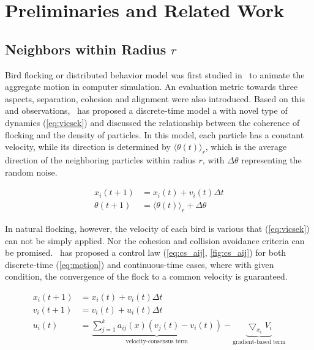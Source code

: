 \chapter{Preliminaries and Related Work}\label{preliminaries}

\section{Neighbors within Radius $r$}\label{flocking}

Bird flocking or distributed behavior model was first studied in~\cite{Reynolds1987} to animate the aggregate motion in computer simulation. An evaluation metric towards three aspects, separation, cohesion and alignment were also introduced. Based on this and observations,~\cite{Vicsek1995} has proposed a discrete-time model a with novel type of dynamics (\ref{eq:vicsek}) and discussed the relationship between the coherence of flocking and the density of particles. In this model, each particle has a constant velocity, while its direction is determined by ${\langle\theta(t)\rangle}_r$, which is the average direction of the neighboring particles within radius $r$, with $\Delta\theta$ representing the random noise.

\begin{equation}\label{eq:vicsek}
\begin{aligned}
x_i(t+1)&=x_i(t)+v_i(t)\Delta t\\
\theta(t+1)&={\langle\theta(t)\rangle}_r+\Delta\theta
\end{aligned}
\end{equation}

In natural flocking, however, the velocity of each bird is various that (\ref{eq:vicsek}) can not be simply applied. Nor the cohesion and collision avoidance criteria can be promised.~\cite{CuckerSmale2007} has proposed a control law (\ref{eq:cs_aij}, \ref{fig:cs_aij}) for both discrete-time (\ref{eq:motion}) and continuous-time cases, where with given condition, the convergence of the flock to a common velocity is guaranteed.

\begin{equation}\label{eq:motion}
\begin{aligned}
x_i(t+1)&=x_i(t)+v_i(t)\Delta t\\
v_i(t+1)&=v_i(t)+u_i(t)\Delta t\\
u_i(t)&=\underbrace{\sum^k_{j=1}a_{ij}(x)(v_j(t)-v_i(t))}_{\text{velocity-consensus term}}-\underbrace{\bigtriangledown_{x_i}V_i}_{\text{gradient-based term}}
\end{aligned}
\end{equation}

